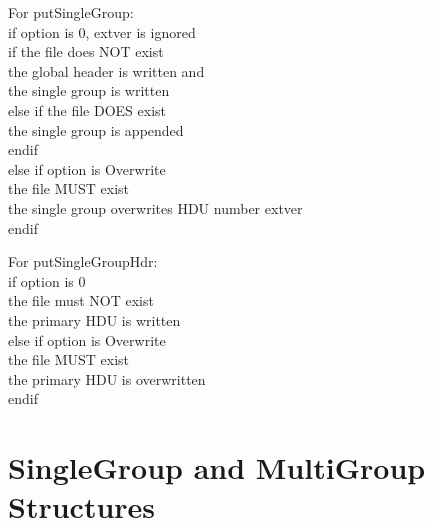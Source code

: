 For putSingleGroup:\\
\null \hspace{0.5in}
	if option is 0, extver is ignored\\
\null \hspace{1.0in}
		if the file does NOT exist\\
\null \hspace{1.5in}
			the global header is written and\\
\null \hspace{1.5in}
			the single group is written\\
\null \hspace{1.0in}
		else if the file DOES exist\\
\null \hspace{1.5in}
			the single group is appended\\
\null \hspace{1.0in}
		endif\\
\null \hspace{0.5in}
	else if option is Overwrite\\
\null \hspace{1.0in}
		the file MUST exist\\
\null \hspace{1.0in}
		the single group overwrites HDU number extver\\
\null \hspace{0.5in}
	endif

For putSingleGroupHdr:\\
\null \hspace{0.5in}
	if option is 0\\
\null \hspace{1.0in}
		the file must NOT exist\\
\null \hspace{1.0in}
		the primary HDU is written\\
\null \hspace{0.5in}
	else if option is Overwrite\\
\null \hspace{1.0in}
		the file MUST exist\\
\null \hspace{1.0in}
		the primary HDU is overwritten\\
\null \hspace{0.5in}
	endif


\section {
SingleGroup and MultiGroup Structures
}

